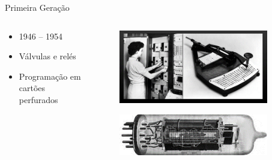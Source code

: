 \documentclass[aspectratio=169,
				xcolor=table]{beamer}
\begin{document}
	\begin{frame}[t]{Primeira Geração}
		\begin{columns}[t]
			\begin{column}{0.65\textwidth}
				\begin{itemize}
					\item 1946 – 1954 
					\vspace{1em}
					\item Válvulas e relés
					\vspace{1em}
					\item Programação em cartões perfurados
				\end{itemize}
			\end{column}
			\begin{column}{0.35\textwidth}
				\begin{figure}
					\includegraphics[width=0.9\textwidth, keepaspectratio]{../figs/cap03/geracao11} 			
				\end{figure}
				\begin{figure}
					\includegraphics[width=0.9\textwidth, keepaspectratio]{../figs/cap03/geracao12} 			
				\end{figure}
			\end{column}
		\end{columns}
	\end{frame}
\end{document}
